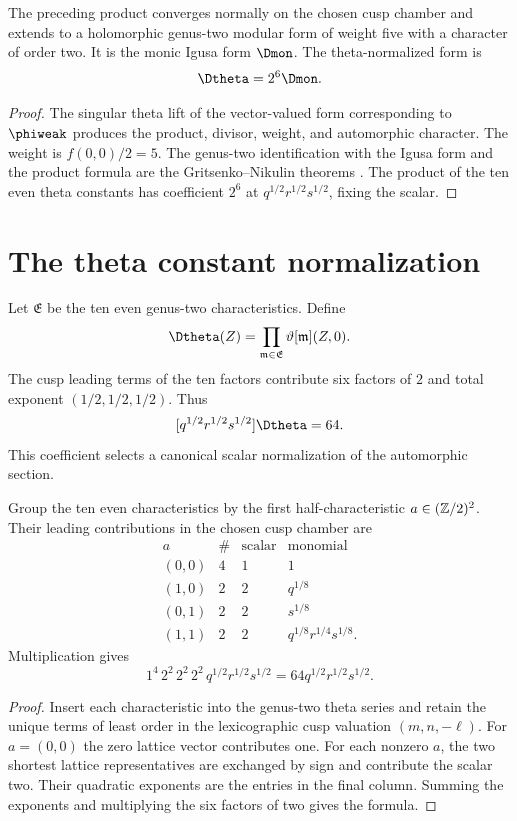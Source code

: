 \begin{theorem}
The preceding product converges normally on the chosen cusp chamber and extends to a holomorphic genus-two modular form of weight five with a character of order two. It is the monic Igusa form $\Dmon$. The theta-normalized form is
\[
 \Dtheta=2^6\Dmon.
\]
\end{theorem}
\begin{proof}
The singular theta lift of the vector-valued form corresponding to $\phiweak$ produces the product, divisor, weight, and automorphic character. The weight is $f(0,0)/2=5$. The genus-two identification with the Igusa form and the product formula are the Gritsenko--Nikulin theorems \cite{Borcherds95,Borcherds98,GN97,GN98b}. The product of the ten even theta constants has coefficient $2^6$ at $q^{1/2}r^{1/2}s^{1/2}$, fixing the scalar.
\end{proof}

\section{The theta constant normalization}
Let $\mathfrak E$ be the ten even genus-two characteristics. Define
\[
 \Dtheta(Z)=\prod_{\mathfrak m\in\mathfrak E}\vartheta[\mathfrak m](Z,0).
\]
The cusp leading terms of the ten factors contribute six factors of $2$ and total exponent $(1/2,1/2,1/2)$. Thus
\[
 [q^{1/2}r^{1/2}s^{1/2}]\Dtheta=64.
\]
This coefficient selects a canonical scalar normalization of the automorphic section.

\begin{proposition}
Group the ten even characteristics by the first half-characteristic $a\in(\mathbb Z/2)^2$. Their leading contributions in the chosen cusp chamber are
\[
\begin{array}{c|c|c|c}
a&\#&\text{scalar}&\text{monomial}\\ \hline
(0,0)&4&1&1\\
(1,0)&2&2&q^{1/8}\\
(0,1)&2&2&s^{1/8}\\
(1,1)&2&2&q^{1/8}r^{1/4}s^{1/8}.
\end{array}
\]
Multiplication gives
\[
 1^4\,2^2\,2^2\,2^2\,
 q^{1/2}r^{1/2}s^{1/2}
 =64q^{1/2}r^{1/2}s^{1/2}.
\]
\end{proposition}
\begin{proof}
Insert each characteristic into the genus-two theta series and retain the unique terms of least order in the lexicographic cusp valuation $(m,n,-\ell)$. For $a=(0,0)$ the zero lattice vector contributes one. For each nonzero $a$, the two shortest lattice representatives are exchanged by sign and contribute the scalar two. Their quadratic exponents are the entries in the final column. Summing the exponents and multiplying the six factors of two gives the formula.
\end{proof}

